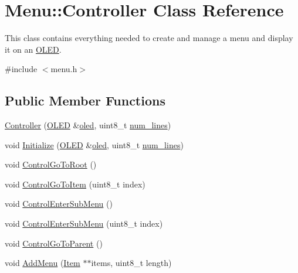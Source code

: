 \hypertarget{class_menu_1_1_controller}{}\section{Menu\+:\+:Controller Class Reference}
\label{class_menu_1_1_controller}


This class contains everything needed to create and manage a menu and display it on an \hyperlink{class_o_l_e_d}{O\+L\+ED}.  




{\ttfamily \#include $<$menu.\+h$>$}

\subsection*{Public Member Functions}
\begin{DoxyCompactItemize}
\item 
\hyperlink{class_menu_1_1_controller_afcbda47e43a9753875631f0d4106f604}{Controller} (\hyperlink{class_o_l_e_d}{O\+L\+ED} \&\hyperlink{class_menu_1_1_controller_aaa0388123d9e3bb0d4f546336e2b502d}{oled}, uint8\+\_\+t \hyperlink{class_menu_1_1_controller_a80d614a66d1ffa2612688776842f1f31}{num\+\_\+lines})
\item 
void \hyperlink{class_menu_1_1_controller_a9cf59f4581c2f1943bde424060476c40}{Initialize} (\hyperlink{class_o_l_e_d}{O\+L\+ED} \&\hyperlink{class_menu_1_1_controller_aaa0388123d9e3bb0d4f546336e2b502d}{oled}, uint8\+\_\+t \hyperlink{class_menu_1_1_controller_a80d614a66d1ffa2612688776842f1f31}{num\+\_\+lines})
\item 
void \hyperlink{class_menu_1_1_controller_a4d270009fff9dfc6baa4433f219626c4}{Control\+Go\+To\+Root} ()
\item 
void \hyperlink{class_menu_1_1_controller_a0dae623388e9bb9e651385d0ef9a2394}{Control\+Go\+To\+Item} (uint8\+\_\+t index)
\item 
void \hyperlink{class_menu_1_1_controller_a9a4c0ccd822f485834ec9abb4133a059}{Control\+Enter\+Sub\+Menu} ()
\item 
void \hyperlink{class_menu_1_1_controller_a8bc1d62574e86a08d5a60652370dd21a}{Control\+Enter\+Sub\+Menu} (uint8\+\_\+t index)
\item 
void \hyperlink{class_menu_1_1_controller_ad4bcb0925c933dce2cceacdbd1b26294}{Control\+Go\+To\+Parent} ()
\item 
void \hyperlink{class_menu_1_1_controller_ab530ec11f04b96254b93961d26152d3c}{Add\+Menu} (\hyperlink{struct_menu_1_1_item}{Item} $\ast$$\ast$items, uint8\+\_\+t length)
$$
\end{DoxyCompactItemize}
